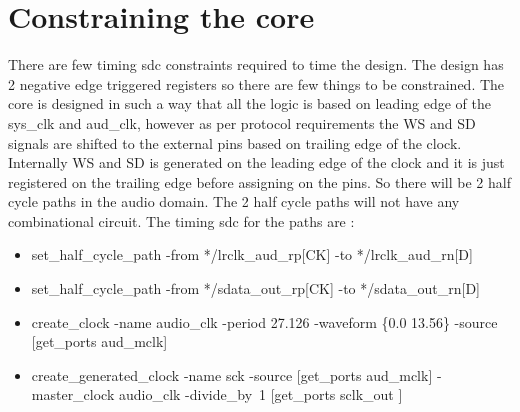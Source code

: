 \documentclass[12pt,a4paper]{report}
\begin{document}
\chapter{Constraining the core}

There are few timing sdc constraints required to time the design. The design has 2 negative edge triggered registers so there are few things to be constrained.
The core is designed in such a way that all the logic is based on leading edge of the sys\_clk and aud\_clk,  however as per protocol requirements the WS and SD signals are shifted to the external pins based on trailing edge of the clock.  Internally WS and SD is generated on the leading edge of the clock and it is just registered on the trailing edge before assigning on the pins. So there will be 2 half cycle paths in the audio domain.
The 2 half cycle paths will not have any combinational circuit.
The timing sdc for the  paths are :

\begin{itemize}
\item set\_half\_cycle\_path    -from */lrclk\_aud\_rp[CK]   -to     */lrclk\_aud\_rn[D]
\item set\_half\_cycle\_path    -from */sdata\_out\_rp[CK]    -to     */sdata\_out\_rn[D]
\item create\_clock -name    audio\_clk -period 27.126 -waveform \{0.0 13.56\}    -source [get\_ports aud\_mclk]
\item  create\_generated\_clock   -name sck   -source    [get\_ports aud\_mclk]   -master\_clock audio\_clk -divide\_by\ 1  [get\_ports sclk\_out ]
\end{itemize}
\end{document}
